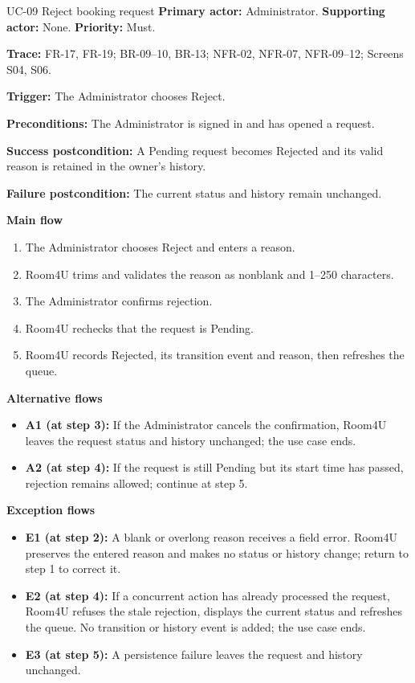 \begin{usecasebox}{UC-09 Reject booking request}
\noindent\textbf{Primary actor:} Administrator.\quad
\textbf{Supporting actor:} None.\quad
\textbf{Priority:} Must.\par
\textbf{Trace:} FR-17, FR-19; BR-09--10, BR-13; NFR-02, NFR-07, NFR-09--12; Screens S04, S06.\par
\textbf{Trigger:} The Administrator chooses Reject.\par
\textbf{Preconditions:} The Administrator is signed in and has opened a request.\par
\textbf{Success postcondition:} A Pending request becomes Rejected and its valid reason is retained in the owner's history.\par
\textbf{Failure postcondition:} The current status and history remain unchanged.\par
\textbf{Main flow}
\begin{enumerate}[label=\arabic*.,leftmargin=2em,itemsep=1pt,topsep=2pt]
  \item The Administrator chooses Reject and enters a reason.
  \item Room4U trims and validates the reason as nonblank and 1--250 characters.
  \item The Administrator confirms rejection.
  \item Room4U rechecks that the request is Pending.
  \item Room4U records Rejected, its transition event and reason, then refreshes the queue.
\end{enumerate}
\textbf{Alternative flows}
\begin{itemize}[label={},leftmargin=0pt,itemsep=1pt,topsep=1pt]
  \item \textbf{A1 (at step 3):} If the Administrator cancels the confirmation, Room4U leaves the request status and history unchanged; the use case ends.
  \item \textbf{A2 (at step 4):} If the request is still Pending but its start time has passed, rejection remains allowed; continue at step 5.
\end{itemize}
\textbf{Exception flows}
\begin{itemize}[label={},leftmargin=0pt,itemsep=1pt,topsep=1pt]
  \item \textbf{E1 (at step 2):} A blank or overlong reason receives a field error. Room4U preserves the entered reason and makes no status or history change; return to step 1 to correct it.
  \item \textbf{E2 (at step 4):} If a concurrent action has already processed the request, Room4U refuses the stale rejection, displays the current status and refreshes the queue. No transition or history event is added; the use case ends.
  \item \textbf{E3 (at step 5):} A persistence failure leaves the request and history unchanged.
\end{itemize}
\end{usecasebox}

